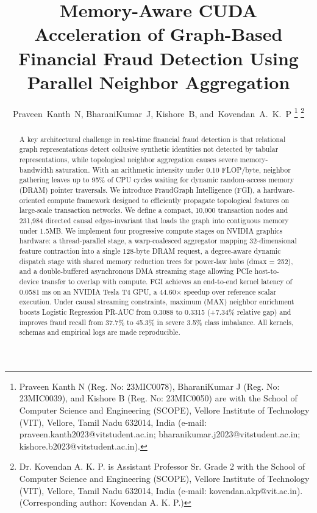 \documentclass[journal]{IEEEtran}
\begin{document}
\title{Memory-Aware CUDA Acceleration of Graph-Based Financial Fraud Detection Using Parallel Neighbor Aggregation}

\author{Praveen~Kanth~N,
        BharaniKumar~J,
        Kishore~B,
        and~Kovendan~A.~K.~P%
\thanks{Praveen Kanth N (Reg. No: 23MIC0078), BharaniKumar J (Reg. No: 23MIC0039), and Kishore B (Reg. No: 23MIC0050) are with the School of Computer Science and Engineering (SCOPE), Vellore Institute of Technology (VIT), Vellore, Tamil Nadu 632014, India (e-mail: praveen.kanth2023@vitstudent.ac.in; bharanikumar.j2023@vitstudent.ac.in; kishore.b2023@vitstudent.ac.in).}%
\thanks{Dr. Kovendan A. K. P. is Assistant Professor Sr. Grade 2 with the School of Computer Science and Engineering (SCOPE), Vellore Institute of Technology (VIT), Vellore, Tamil Nadu 632014, India (e-mail: kovendan.akp@vit.ac.in). (Corresponding author: Kovendan A. K. P.)}%
}

\maketitle
\thispagestyle{empty}
\pagestyle{empty}

\begin{abstract}
A key architectural challenge in real-time financial fraud detection is that relational graph representations detect collusive synthetic identities not detected by tabular representations, while topological neighbor aggregation causes severe memory-bandwidth saturation. With an arithmetic intensity under 0.10 FLOP/byte, neighbor gathering leaves up to 95\% of CPU cycles waiting for dynamic random-access memory (DRAM) pointer traversals. We introduce FraudGraph Intelligence (FGI), a hardware-oriented compute framework designed to efficiently propagate topological features on large-scale transaction networks. We define a compact, 10,000 transaction nodes and 231,984 directed causal edges-invariant that loads the graph into contiguous memory under 1.5MB. We implement four progressive compute stages on NVIDIA graphics hardware: a thread-parallel stage, a warp-coalesced aggregator mapping 32-dimensional feature contraction into a single 128-byte DRAM request, a degree-aware dynamic dispatch stage with shared memory reduction trees for power-law hubs (dmax = 252), and a double-buffered asynchronous DMA streaming stage allowing PCIe host-to-device transfer to overlap with compute. FGI achieves an end-to-end kernel latency of 0.0581 ms on an NVIDIA Tesla T4 GPU, a 44.60$\times$ speedup over reference scalar execution. Under causal streaming constraints, maximum (MAX) neighbor enrichment boosts Logistic Regression PR-AUC from 0.3088 to 0.3315 (+7.34\% relative gap) and improves fraud recall from 37.7\% to 45.3\% in severe 3.5\% class imbalance. All kernels, schemas and empirical logs are made reproducible.
\end{abstract}
\end{document}
